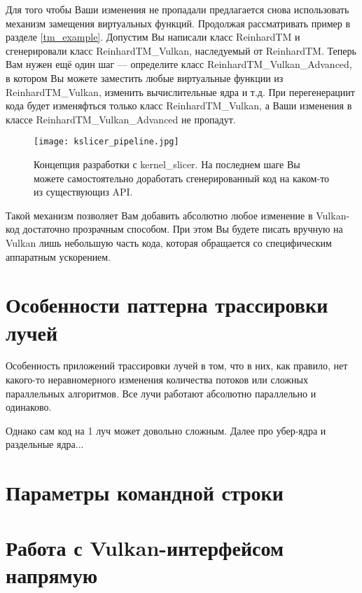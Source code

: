 \documentclass[11pt,fleqn,english,russian]{report} %
\begin{document}
Для того чтобы Ваши изменения не пропадали предлагается снова использовать механизм замещения виртуальных функций. Продолжая рассматривать пример в разделе \ref{tm_example}. Допустим Вы написали класс ReinhardTM и сгенерировали класс ReinhardTM\_Vulkan, наследуемый от ReinhardTM. Теперь Вам нужен ещё один шаг --- определите класс ReinhardTM\_Vulkan\_Advanced, в котором Вы можете заместить любые виртуальные функции из ReinhardTM\_Vulkan, изменить вычислительные ядра и т.д. При перегенерациит кода будет изменяфться только класс ReinhardTM\_Vulkan, а Ваши изменения в классе ReinhardTM\_Vulkan\_Advanced не пропадут.


\begin{figure}[h!]
\centering
\texttt{[image: kslicer\_pipeline.jpg]}
\caption{Концепция разработки с kernel\_slicer. На последнем шаге Вы можете самостоятельно доработать сгенерированный код на каком-то из существующиз API.}
\end{figure}

Такой механизм позволяет Вам добавить абсолютно любое изменение в Vulkan-код достаточно прозрачным способом. При этом Вы будете писать вручную на Vulkan лишь небольшую часть кода, которая обращается со специфическим аппаратным ускорением.

\chapter{Особенности паттерна трассировки лучей}

Особенность приложений трассировки лучей в том, что в них, как правило, нет какого-то неравномерного изменения количества потоков или сложных параллельных алгоритмов. Все лучи работают абсолютно параллельно и одинаково.

Однако сам код на 1 луч может довольно сложным. Далее про убер-ядра и раздельные ядра... 

\chapter{Параметры командной строки}


\chapter{Работа с Vulkan-интерфейсом напрямую}\label{vulkan-direct}
\end{document}
